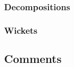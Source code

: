 \documentclass[12pt,reqno]{amsart} %
\begin{document}
\subsubsection{Decompositions}


\lipsum[6]

\subsubsection{Wickets}

\lipsum[3]

\subsection{Comments}

\lipsum[2]


\renewcommand{\mkbibnamefamily}[1]{\textsc{#1}}
\printbibliography

\appendix


\medskip
\end{document}

